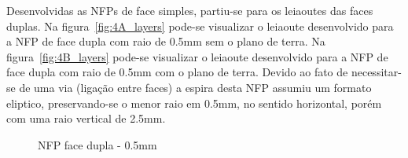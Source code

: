 Desenvolvidas as NFPs de face simples, partiu-se para os leiaoutes das faces duplas. Na figura~\ref{fig:4A_layers} pode-se visualizar o leiaoute desenvolvido para a NFP de face dupla com raio de 0.5mm sem o plano de terra. Na figura~\ref{fig:4B_layers} pode-se visualizar o leiaoute desenvolvido para a NFP de face dupla com raio de 0.5mm com o plano de terra. Devido ao fato de necessitar-se de uma via (ligação entre faces) a espira desta NFP assumiu um formato eliptico, preservando-se o menor raio em 0.5mm, no sentido horizontal, porém com uma raio vertical de 2.5mm.
\begin{figure}[htb!]
	\centering
 	\caption{NFP face dupla - 0.5mm}
\end{figure}
